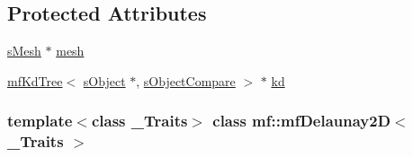 \subsection*{Protected Attributes}
\begin{DoxyCompactItemize}
\item 
\hyperlink{classmf_1_1mfDelaunay2D_ad1c5c239afa497e1c8edef8f1046a58a}{sMesh} $\ast$ \hyperlink{classmf_1_1mfDelaunay2D_a13c2a7b6100bae67ac768daaa5973089}{mesh}
\item 
\hyperlink{classmf_1_1mfKdTree}{mfKdTree}$<$ \hyperlink{classmf_1_1mfDelaunay2D_1_1sObject}{sObject} $\ast$, \hyperlink{classmf_1_1mfDelaunay2D_1_1sObjectCompare}{sObjectCompare} $>$ $\ast$ \hyperlink{classmf_1_1mfDelaunay2D_aae51b27eea6af857950d06706393ca74}{kd}
\end{DoxyCompactItemize}
\subsubsection*{template$<$class \_\-Traits$>$ class mf::mfDelaunay2D$<$ \_\-Traits $>$}



